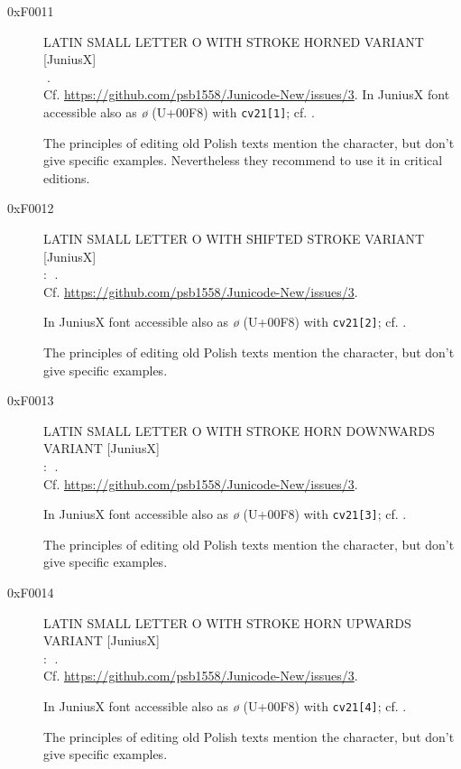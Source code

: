 \documentclass{article}
\newcommand{\Jglyph}[1]{{\relsize{2}\J#1}}
\begin{document}
\begin{description}
 \item [0xF0011] LATIN SMALL LETTER O WITH STROKE HORNED VARIANT [JuniusX]\\
  \Jglyph{󰀑}.\\  Cf. \url{https://github.com/psb1558/Junicode-New/issues/3}.
  In JuniusX font accessible also as \textit{ø} (U+00F8) with \texttt{cv21[1]};
  cf. \autocite[p. 9]{baker20:_opent_featur_junius_junius}.

  The principles of editing old Polish texts
  \autocite{Górski_Konrad__Zasady} mention the character, but don't
  give specific examples. Nevertheless they recommend to use it in
  critical editions.
  
\item [0xF0012] LATIN SMALL LETTER O WITH SHIFTED STROKE VARIANT [JuniusX]\\:
  \Jglyph{󰀒}.\\  Cf. \url{https://github.com/psb1558/Junicode-New/issues/3}.
  
  In JuniusX font accessible also as \textit{ø} (U+00F8) with \texttt{cv21[2]};
 cf. \autocite[p. 9]{baker20:_opent_featur_junius_junius}.

 The principles of editing old Polish texts
  \autocite{Górski_Konrad__Zasady} mention the character, but don't
  give specific examples. 

\item [0xF0013] LATIN SMALL LETTER O WITH STROKE HORN DOWNWARDS VARIANT [JuniusX]\\:
  \Jglyph{󰀓}.\\  Cf. \url{https://github.com/psb1558/Junicode-New/issues/3}.

  In JuniusX font accessible also as \textit{ø} (U+00F8) with \texttt{cv21[3]};
  cf. \autocite[p. 9]{baker20:_opent_featur_junius_junius}.

 The principles of editing old Polish texts
  \autocite{Górski_Konrad__Zasady} mention the character, but don't
  give specific examples. 


\item [0xF0014] LATIN SMALL LETTER O WITH STROKE HORN UPWARDS VARIANT [JuniusX]\\:
  \Jglyph{󰀓}.\\  Cf. \url{https://github.com/psb1558/Junicode-New/issues/3}.

  In JuniusX font accessible also as \textit{ø} (U+00F8) with \texttt{cv21[4]};
  cf. \autocite[p. 9]{baker20:_opent_featur_junius_junius}.

 The principles of editing old Polish texts
  \autocite{Górski_Konrad__Zasady} mention the character, but don't
  give specific examples. 




\end{description}
\end{document}
